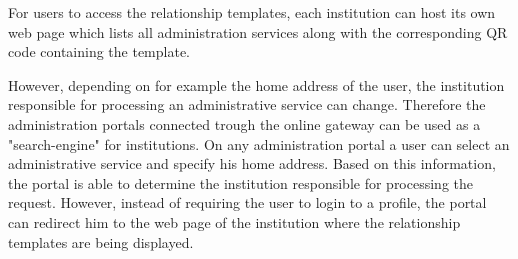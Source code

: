 For users to access the relationship templates, each institution can host its own web page which lists all administration services along with the corresponding QR code containing the template.

However, depending on for example the home address of the user, the institution responsible for processing an administrative service can change. Therefore the administration portals connected trough the online gateway can be used as a "search-engine" for institutions. On any administration portal a user can select an administrative service and specify his home address. Based on this information, the portal is able to determine the institution responsible for processing the request. However, instead of requiring the user to login to a profile, the portal can redirect him to the web page of the institution where the relationship templates are being displayed.
